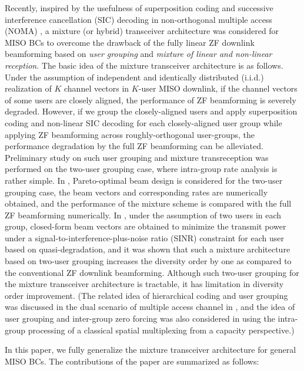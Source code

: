 \documentclass[11pt, draft, onecolumn ]{IEEEtran}
\begin{document}
Recently,  inspired by the  usefulness of superposition coding and successive interference cancellation (SIC) decoding in non-orthogonal multiple access  (NOMA) \cite{Saito:13VTC,mao2018rate}, a mixture (or hybrid) transceiver architecture was considered for MISO BCs  to
overcome  the drawback of the fully linear ZF downlink
beamforming based on {\em  user grouping} and {\em mixture of linear and non-linear reception}\cite{Seo&Sung:17SPAWC,Chen&Ding&Dai:16Access}.
The basic idea of the {}{mixture} transceiver architecture is as follows.
Under the assumption of independent and identically distributed (i.i.d.) realization of $K$ channel vectors
in  $K$-user MISO downlink,   if the channel
vectors of some users are closely aligned, the performance of ZF beamforming is severely degraded. However, if we group the closely-aligned users
and apply  superposition coding and non-linear SIC decoding
for each closely-aligned user group while applying ZF beamforming
across roughly-orthogonal user-groups, the performance degradation
by the full ZF beamforming can be alleviated. Preliminary study on such user grouping and  mixture transreception was performed on the two-user grouping case, where  intra-group rate analysis is rather simple\cite{Seo&Sung:17SPAWC,Chen&Ding&Dai:16Access}.
In \cite{Seo&Sung:17SPAWC}, Pareto-optimal beam design is considered for the two-user grouping case, the beam vectors and corresponding rates are numerically obtained, and  the performance of the mixture scheme is compared with the full ZF beamforming numerically.
In \cite{Chen&Ding&Dai:16Access}, under the assumption of two users in each group, closed-form beam vectors are obtained  to minimize the transmit power under a  signal-to-interference-plus-noise ratio (SINR) constraint for each user based on quasi-degradation, and it was shown that such a mixture architecture based on two-user grouping increases the diversity order by one as compared to the conventional ZF downlink beamforming. Although such two-user grouping for the mixture transceiver architecture is  tractable, it has limitation in diversity order improvement. (The related idea of hierarchical coding and user grouping  was  discussed  in the dual scenario of multiple access channel in \cite{Hamid08COM}, {}{and the idea of user grouping and inter-group zero forcing was also considered in \cite{Adhikary13IT} using the intra-group processing of a classical spatial multiplexing from a capacity perspective.})



In this paper, we fully generalize the mixture transceiver architecture for general MISO BCs. The contributions of the paper are summarized as follows:
\end{document}
